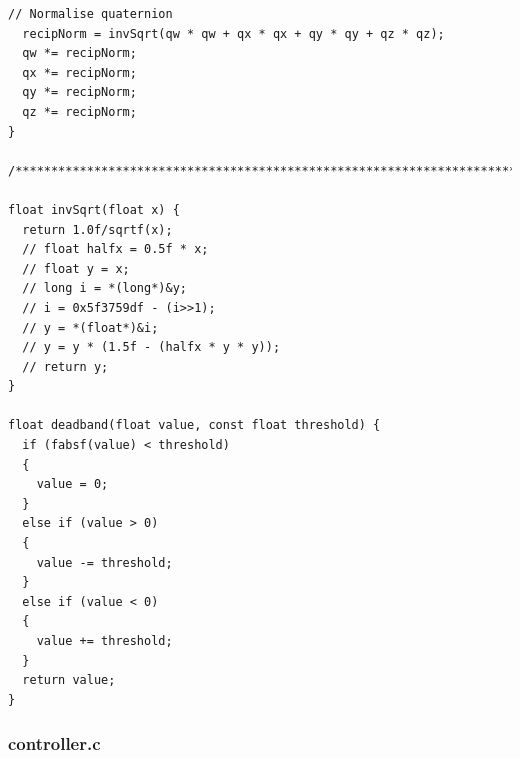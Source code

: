 \begin{lstlisting}[caption={estimator.c}]
  // Normalise quaternion
  recipNorm = invSqrt(qw * qw + qx * qx + qy * qy + qz * qz);
  qw *= recipNorm;
  qx *= recipNorm;
  qy *= recipNorm;
  qz *= recipNorm;
}

/**********************************************************************/

float invSqrt(float x) {
  return 1.0f/sqrtf(x);
  // float halfx = 0.5f * x;
  // float y = x;
  // long i = *(long*)&y;
  // i = 0x5f3759df - (i>>1);
  // y = *(float*)&i;
  // y = y * (1.5f - (halfx * y * y));
  // return y;
}

float deadband(float value, const float threshold) {
  if (fabsf(value) < threshold)
  {
    value = 0;
  }
  else if (value > 0)
  {
    value -= threshold;
  }
  else if (value < 0)
  {
    value += threshold;
  }
  return value;
}

\end{lstlisting}

\subsubsection{controller.c}

